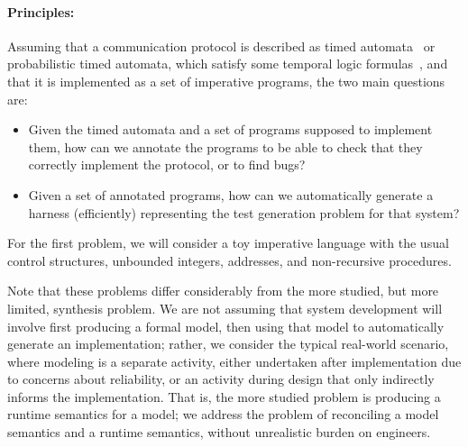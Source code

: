 \paragraph{Principles:} Assuming that a communication protocol is described
as timed automata~\cite{AD1994:TCS} or probabilistic timed automata,
which satisfy some temporal logic
formulas~\cite{BLM2017:LNCS}, and that it is implemented as a set of
imperative programs, the two main questions are:
\begin{itemize}
\item Given the timed automata and a set of programs supposed to
  implement them, how can we annotate the programs to be able to check
  that they correctly implement the protocol, or to find bugs?
\item Given a set of annotated programs, how can we automatically
  generate a harness (efficiently) representing the test generation problem for that system?
\end{itemize}
For the first problem, we will consider a toy imperative language with the 
usual control structures, unbounded integers, addresses, and 
non-recursive procedures.

Note that these problems differ considerably from the more studied,
but more limited, synthesis problem.  We are not assuming that
system development will involve first producing a formal model, then
using that model to automatically generate an implementation; rather,
we consider the typical real-world scenario, where modeling is a
separate activity, either undertaken after implementation due to
concerns about reliability, or an activity during design that only
indirectly informs the implementation.  That is, the more studied
problem is producing a runtime semantics for a model; we address the
problem of reconciling a model semantics and a runtime semantics,
without unrealistic burden on engineers.


